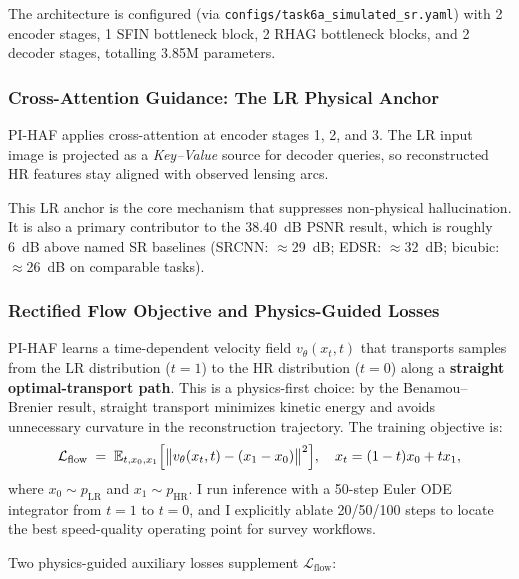 \documentclass[11pt,a4paper]{article}
\newcommand{\vtheta}{v_\theta}
\newcommand{\xt}{x_t}
\newcommand{\xzero}{x_0}
\newcommand{\xone}{x_1}
\newcommand{\bE}{\mathbb{E}}
\newcommand{\Lflow}{\mathcal{L}_{\text{flow}}}
\begin{document}
The architecture is configured (via \texttt{configs/task6a\_simulated\_sr.yaml}) with 2 encoder stages, 1 SFIN bottleneck block, 2 RHAG bottleneck blocks, and 2 decoder stages, totalling 3.85M parameters.

\subsubsection{Cross-Attention Guidance: The LR Physical Anchor}

PI-HAF applies cross-attention at encoder stages 1, 2, and 3. The LR input image is projected as a \emph{Key--Value} source for decoder queries, so reconstructed HR features stay aligned with observed lensing arcs.

This LR anchor is the core mechanism that suppresses non-physical hallucination. It is also a primary contributor to the 38.40~dB PSNR result, which is roughly 6~dB above named SR baselines (SRCNN: $\approx$29~dB; EDSR: $\approx$32~dB; bicubic: $\approx$26~dB on comparable tasks).

\subsubsection{Rectified Flow Objective and Physics-Guided Losses}

PI-HAF learns a time-dependent velocity field $\vtheta(\xt, t)$ that transports samples from the LR distribution ($t=1$) to the HR distribution ($t=0$) along a \textbf{straight optimal-transport path}. This is a physics-first choice: by the Benamou--Brenier result, straight transport minimizes kinetic energy and avoids unnecessary curvature in the reconstruction trajectory. The training objective is:
\begin{equation}
  \Lflow \;=\; \bE_{t, \xzero, \xone}\Bigl[\bigl\|\vtheta(\xt, t) - (\xone - \xzero)\bigr\|^2\Bigr],
  \quad \xt = (1-t)\xzero + t\xone,
\end{equation}
where $\xzero \sim p_{\text{LR}}$ and $\xone \sim p_{\text{HR}}$. I run inference with a 50-step Euler ODE integrator from $t=1$ to $t=0$, and I explicitly ablate 20/50/100 steps to locate the best speed-quality operating point for survey workflows.

Two physics-guided auxiliary losses supplement $\Lflow$:
\end{document}
